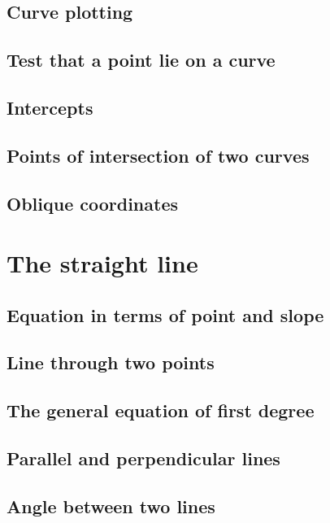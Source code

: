 \documentclass{book}
\begin{document}
	\section{Curve plotting} \lipsum[2]
	\section{Test that a point lie on a curve} \lipsum[3]
	\section{Intercepts} \lipsum[4]
	\section{Points of intersection of two curves} \lipsum[5]
	\section{Oblique coordinates} \lipsum[6]

\chapter{The straight line}
	\section{Equation in terms of point and slope} \lipsum[1]
	\section{Line through two points} \lipsum[2]
	\section{The general equation of first degree} \lipsum[3]
	\section{Parallel and perpendicular lines} \lipsum[4]
	\section{Angle between two lines} \lipsum[5]
\end{document}
